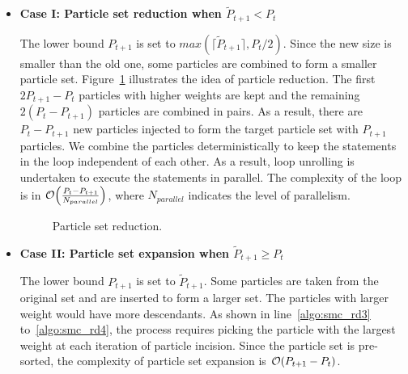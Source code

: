\begin{itemize}
\item {\bf Case I: Particle set reduction when $\widetilde{P}_{t+1} < P_{t}$} 

The lower bound $P_{t+1}$ is set to $max\left(\lceil\widetilde{P}_{t+1}\rceil, P_{t}/2\right)$.
Since the new size is smaller than the old one, some particles are combined to form a smaller particle set.
Figure~\ref{fig:tuning} illustrates the idea of particle reduction.
The first $2P_{t+1}-P_{t}$ particles with higher weights are kept and the remaining $2(P_{t}-P_{t+1})$ particles are combined in pairs.
As a result, there are $P_{t}-P_{t+1}$ new particles injected to form the target particle set with $P_{t+1}$ particles.
We combine the particles deterministically to keep the statements in the loop independent of each other.
As a result, loop unrolling is undertaken to execute the statements in parallel.
The complexity of the loop is in $\mathop{}\mathopen{}\mathcal{O}\mathopen{}\left(\frac{P_{t}-P_{t+1}}{N_{parallel}}\right)$, where $N_{parallel}$ indicates the level of parallelism.

\setcounter{subfigure}{0}
\begin{figure}[t!]
\centering
{}
\caption{Particle set reduction.}
\label{fig:tuning}
\end{figure}

\item {\bf Case II: Particle set expansion when $\widetilde{P}_{t+1} \geq P_{t}$}

The lower bound $P_{t+1}$ is set to $\widetilde{P}_{t+1}$.
Some particles are taken from the original set and are inserted to form a larger set.
The particles with larger weight would have more descendants.
As shown in line~\ref{algo:smc_rd3} to~\ref{algo:smc_rd4}, the process requires picking the particle with the largest weight at each iteration of particle incision.
Since the particle set is pre-sorted, the complexity of particle set expansion is $\mathop{}\mathopen{}\mathcal{O}\mathopen{}\left(P_{t+1}-P_{t}\right)$.

\end{itemize}

